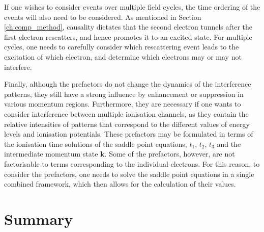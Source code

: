 \documentclass[11pt]{article}
\numberwithin{equation}{section}
\begin{document}
\par
If one wishes to consider events over multiple field cycles, the time ordering of the events will also need to be considered. As mentioned in Section \ref{ch:comp_method}, causality dictates that the second electron tunnels after the first electron rescatters, and hence promotes it to an excited state. For multiple cycles, one needs to carefully consider which rescattering event leads to the excitation of which electron, and determine which electrons may or may not interfere.
\par
Finally, although the prefactors do not change the dynamics of the interference patterns, they still have a strong influence by enhancement or suppression in various momentum regions. Furthermore, they are necessary if one wants to consider interference between multiple ionisation channels, as they contain the relative intensities of patterns that correspond to the different values of energy levels and ionisation potentials. These prefactors may be formulated in terms of the ionisation time solutions of the saddle point equations, $t_1$, $t_2$, $t_3$ and the intermediate momentum state $\mathbf{k}$. Some of the prefactors, however, are not factorisable to terms corresponding to the individual electrons. For this reason, to consider the prefactors, one needs to solve the saddle point equations in a single combined framework, which then allows for the calculation of their values.

\section{Summary}
\end{document}
